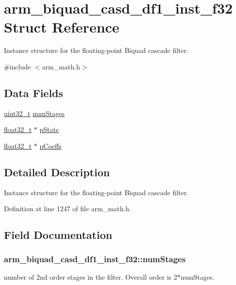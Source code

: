 \hypertarget{structarm__biquad__casd__df1__inst__f32}{\section{arm\-\_\-biquad\-\_\-casd\-\_\-df1\-\_\-inst\-\_\-f32 Struct Reference}
\label{structarm__biquad__casd__df1__inst__f32}
}


Instance structure for the floating-\/point Biquad cascade filter.  




{\ttfamily \#include $<$arm\-\_\-math.\-h$>$}

\subsection*{Data Fields}
\begin{DoxyCompactItemize}
\item 
\hyperlink{stdint_8h_a435d1572bf3f880d55459d9805097f62}{uint32\-\_\-t} \hyperlink{structarm__biquad__casd__df1__inst__f32_af69820c37a87252c46453e4cfe120585}{num\-Stages}
\item 
\hyperlink{arm__math_8h_a4611b605e45ab401f02cab15c5e38715}{float32\-\_\-t} $\ast$ \hyperlink{structarm__biquad__casd__df1__inst__f32_a8c245d79e0d8cfabc82409d4b54fb682}{p\-State}
\item 
\hyperlink{arm__math_8h_a4611b605e45ab401f02cab15c5e38715}{float32\-\_\-t} $\ast$ \hyperlink{structarm__biquad__casd__df1__inst__f32_af9df3820576fb921809d1462c9c6d16c}{p\-Coeffs}
\end{DoxyCompactItemize}


\subsection{Detailed Description}
Instance structure for the floating-\/point Biquad cascade filter. 

Definition at line 1247 of file arm\-\_\-math.\-h.



\subsection{Field Documentation}
\hypertarget{structarm__biquad__casd__df1__inst__f32_af69820c37a87252c46453e4cfe120585}{
\subsubsection[{num\-Stages}]{ arm\-\_\-biquad\-\_\-casd\-\_\-df1\-\_\-inst\-\_\-f32\-::num\-Stages}}\label{structarm__biquad__casd__df1__inst__f32_af69820c37a87252c46453e4cfe120585}
number of 2nd order stages in the filter. Overall order is 2$\ast$num\-Stages. 

